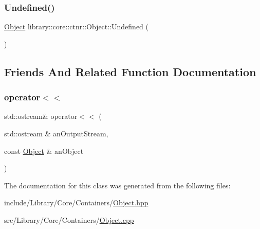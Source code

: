 \mbox{\label{classlibrary_1_1core_1_1ctnr_1_1_object_a9b222d8bf5599b6f2a658bda003f6f06}} 
\subsubsection{\texorpdfstring{Undefined()}{Undefined()}}
{\footnotesize\ttfamily \hyperlink{classlibrary_1_1core_1_1ctnr_1_1_object}{Object} library\+::core\+::ctnr\+::\+Object\+::\+Undefined (\begin{DoxyParamCaption}{ }\end{DoxyParamCaption})\hspace{0.3cm}{\ttfamily [static]}}



\subsection{Friends And Related Function Documentation}
\mbox{\label{classlibrary_1_1core_1_1ctnr_1_1_object_a418df9bf4a73078f3d494edef1743f8d}} 
\subsubsection{\texorpdfstring{operator$<$$<$}{operator<<}}
{\footnotesize\ttfamily std\+::ostream\& operator$<$$<$ (\begin{DoxyParamCaption}\item[{std\+::ostream \&}]{an\+Output\+Stream,  }\item[{const \hyperlink{classlibrary_1_1core_1_1ctnr_1_1_object}{Object} \&}]{an\+Object }\end{DoxyParamCaption})\hspace{0.3cm}{\ttfamily [friend]}}



The documentation for this class was generated from the following files\+:\begin{DoxyCompactItemize}
\item 
include/\+Library/\+Core/\+Containers/\hyperlink{_object_8hpp}{Object.\+hpp}\item 
src/\+Library/\+Core/\+Containers/\hyperlink{_object_8cpp}{Object.\+cpp}\end{DoxyCompactItemize}
